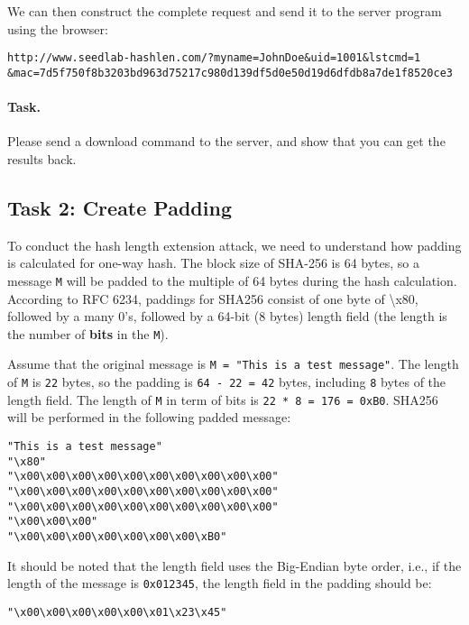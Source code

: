 We can then construct the complete request and send it to the server program using
the browser:

\begin{lstlisting}
http://www.seedlab-hashlen.com/?myname=JohnDoe&uid=1001&lstcmd=1
&mac=7d5f750f8b3203bd963d75217c980d139df5d0e50d19d6dfdb8a7de1f8520ce3
\end{lstlisting}

\paragraph{Task.} Please send a download command to the server, and
show that you can get the results back.


\subsection{Task 2: Create Padding}

To conduct the hash length extension attack, we
need to understand how padding is calculated for
one-way hash. The block size of SHA-256 is 64 bytes, so
a message \texttt{M} will be padded to the multiple of
64 bytes during the hash calculation.
According to RFC 6234, paddings for SHA256 consist of one byte
of \textbackslash x80, followed by a many 0's, followed by a
64-bit (8 bytes) length field (the length is the number
of \textbf{bits} in the \texttt{M}).

Assume that the original message is \texttt{M = "This is a test message"}.
The length of \texttt{M} is \texttt{22} bytes, so the
padding is \texttt{64 - 22 = 42} bytes, including \texttt{8} bytes of the length field.
The length of \texttt{M} in term of bits
is \texttt{22 * 8 = 176 = 0xB0}.
SHA256 will be performed in the following padded
message:

\begin{lstlisting}
"This is a test message"
"\x80"
"\x00\x00\x00\x00\x00\x00\x00\x00\x00\x00"
"\x00\x00\x00\x00\x00\x00\x00\x00\x00\x00"
"\x00\x00\x00\x00\x00\x00\x00\x00\x00\x00"
"\x00\x00\x00"
"\x00\x00\x00\x00\x00\x00\x00\xB0"
\end{lstlisting}


It should be noted that
the length field uses the Big-Endian byte order, i.e.,
if the length of the message is \texttt{0x012345},
the length field in the padding should be:
\begin{lstlisting}
"\x00\x00\x00\x00\x00\x01\x23\x45"
\end{lstlisting}


